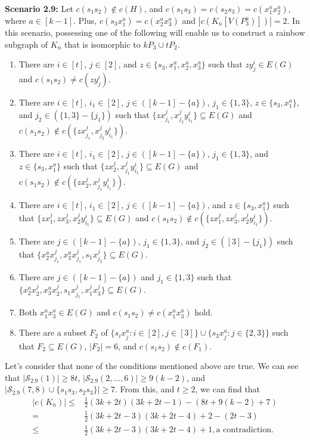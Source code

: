\documentclass[12pt]{article}
\begin{document}
{\bf Scenario 2.9:} Let \(c(s_1s_2) \notin c(H)\), and \(c(s_1s_3) = c(s_2s_3) = c(x^a_1x^a_2)\), where \(a \in [k-1]\). Plus, $c(s_3x^a_1)=c(x^a_2x^a_3)$ and \(|c(K_n[V(P^a_3)])| =2\).
 In this scenario, possessing one of the following will enable us to construct a rainbow subgraph of \(K_n\) that is isomorphic to \(kP_3 \cup tP_2\). 
 \begin{enumerate}
   \item There are $i\in[t]$, $j\in[2]$, and $z\in\{s_3,x^a_1,x^a_2,x^a_3\}$ such that $zy^i_j\in E(G)$ and $c(s_1s_2)\neq c(zy^i_j)$. 
   \item There are $i\in[t]$, $i_1\in[2]$, $j\in([k-1]-\{a\})$, $j_1\in\{1,3\}$, $z\in\{s_3,x_1^a\}$, and $j_2\in(\{1,3\}-\{j_1\})$ such that $\{zx^j_{j_1},x^j_{j_2}y^i_{i_1}\}\subseteq E(G)$ and $c(s_1s_2)\not\in c(\{zx^j_{j_1},x^j_{j_2}y^i_{i_1}\})$.
   \item There are $i\in[t]$, $i_1\in[2]$, $j\in([k-1]-\{a\})$, $j_1\in\{1,3\}$, and $z\in\{s_3,x_1^a\}$ such that $\{zx^j_{2},x^j_{j_1}y^i_{i_1}\}\subseteq E(G)$ and $c(s_1s_2)\not\in c(\{zx^j_{2},x^j_{j_1}y^i_{i_1}\})$.
   \item There are $i\in[t]$, $i_1\in[2]$, $j\in([k-1]-\{a\})$, and $z\in\{s_3,x_1^a\}$ such that $\{zx^j_{1},zx^j_3,x^j_{2}y^i_{i_1}\}\subseteq E(G)$ and $c(s_1s_2)\not\in c(\{zx^j_{1},zx^j_3,x^j_{2}y^i_{i_1}\})$.
    \item There are  $j\in([k-1]-\{a\})$, $j_1\in\{1,3\}$, and $j_2\in([3]-\{j_1\})$ such that $\{x^a_2x^j_{j_1},x^a_3x^j_{j_1},s_1x^j_{j_2}\}\subseteq E(G)$. 
   \item There are $j\in([k-1]-\{a\})$ and $j_1\in\{1,3\}$ such that $\{x^a_2x^j_{2},x^a_3x^j_{2},s_1x^j_{j_1},x_1^jx_3^j\}\subseteq E(G)$.
    \item Both \( x_1^ax_3^a\in E(G) \) and $c(s_1s_2)\neq c(x_1^ax_3^a)$ hold.
   \item There are a subset $F_2$ of $\{s_ix^a_j:i\in[2],j\in[3]\}\cup\{s_3x^a_j:j\in\{2,3\}\}$ such that $F_2\subseteq E(G)$, $|F_2|=6$, and $c(s_1s_2)\not\in c(F_1)$.
 \end{enumerate}
 Let's consider that none of the conditions mentioned above are true. We can see that \( |\mathcal{S}_{2.9}(1)| \geq 8t \), \( |\mathcal{S}_{2.9}(2,\ldots,6)| \geq 9(k-2) \), and \( |\mathcal{S}_{2.9}(7,8) \cup \{s_1s_3,s_2s_3\}| \geq 7 \). From this, and \( t \geq 2 \), we can find that
\begin{align*}
  |c(K_n)|\leq & \frac{1}{2}(3k+2t)(3k+2t-1)-(8t+9(k-2)+7)\\
  =& \frac{1}{2}(3k+2t-3)(3k+2t-4)+2-(2t-3)\\
  \leq &\frac{1}{2}(3k+2t-3)(3k+2t-4)+1, \text{a contradiction}.
\end{align*} 
\end{document}
